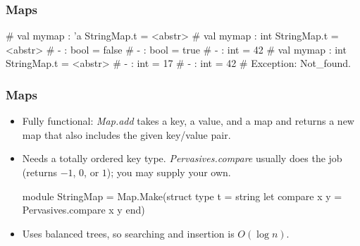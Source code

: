 \documentclass{plt}
\begin{document}
\begin{frame}[fragile]
  \frametitle{Maps}

\begin{interactive}
# 
val mymap : 'a StringMap.t = <abstr>
# 
val mymap : int StringMap.t = <abstr>
# 
- : bool = false
# 
- : bool = true
# 
- : int = 42
# 
val mymap : int StringMap.t = <abstr>
# 
- : int = 17
# 
- : int = 42
# 
Exception: Not_found.
\end{interactive}
\end{frame}

\begin{frame}[fragile]
  \frametitle{Maps}

\begin{itemize}
\item Fully functional: \emph{Map.add} takes a key, a value, and a map
  and returns a new map that also includes the given key/value pair.

\item Needs a totally ordered key type. \emph{Pervasives.compare}
  usually does the job (returns $-1$, $0$, or $1$); you may
  supply your own.

\begin{minipage}{0.7\textwidth}
\begin{ocaml}
module StringMap = Map.Make(struct
  type t = string
  let compare x y = Pervasives.compare x y
end)
\end{ocaml}
\end{minipage}

\item Uses balanced trees, so searching and insertion is $O(\log n)$.

\end{itemize}

\end{frame}
\end{document}
